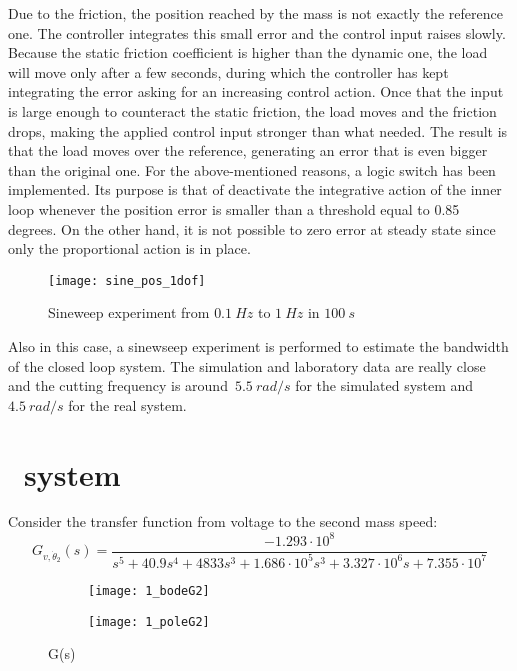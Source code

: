 Due to the friction, the position reached by the mass is not exactly the reference one. The controller integrates this small error and the control input raises slowly. Because the static friction coefficient is higher than the dynamic one, the load will move only after a few seconds, during which the controller has kept integrating the error asking for an increasing control action.
Once that the input is large enough to counteract the static friction, the load moves and the friction drops, making the applied control input stronger than what needed. The result is that the load moves over the reference, generating an error that is even bigger than the original one.
For the above-mentioned reasons, a logic switch has been implemented. Its purpose is that of deactivate the integrative action of the inner loop whenever the position error is smaller than a threshold equal to 0.85 degrees. On the other hand, it is not possible to zero error at steady state since only the proportional action is in place. \\

\begin{figure*}[h]
	\centering
	\texttt{[image: sine\_pos\_1dof]}
	\caption{Sineweep experiment from $0.1\ Hz$ to $1\ Hz$ in $100\ s$}
	\label{fig:sinesweep_pos_1dof}
\end{figure*}

Also in this case, a sinewseep experiment is performed to estimate the bandwidth of the closed loop system. The simulation and laboratory data are really close and the cutting frequency is around~$5.5\ rad/s$ for the simulated system and~$4.5\ rad/s$ for the real system.

\section{\twodof\ system}
Consider the transfer function from voltage to the second mass speed:
\[
G_{v,\dot{\theta}_2}(s)=
\frac{-1.293 \cdot 10^{8}}{s^5+40.9s^{4}+4833s^{3}+1.686 \cdot 10^{5} s^{3}+3.327 \cdot 10^{6} s+7.355 \cdot 10^{7}}
\]

\begin{figure*}[h]
	\centering
	\begin{subfigure}{0.4\columnwidth}
		\texttt{[image: 1\_bodeG2]}
	\end{subfigure}
	\begin{subfigure}{0.4\columnwidth}
		\texttt{[image: 1\_poleG2]}
	\end{subfigure}
	\caption{G(s)}
	\label{fig:G(s)2dof}
\end{figure*}

